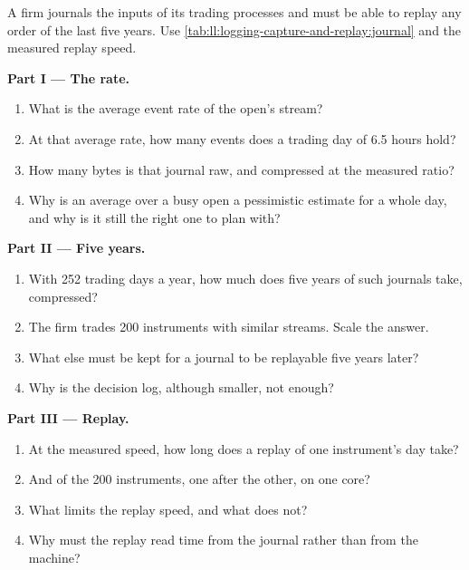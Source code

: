 \begin{problem}\label{pb:ll:logging-capture-and-replay:1}
A firm journals the inputs of its trading processes and must be able to replay any order of the last five years. Use
\cref{tab:ll:logging-capture-and-replay:journal} and the measured replay speed.

\medskip\noindent\textbf{Part I --- The rate.}
\begin{enumerate}
\item What is the average event rate of the open's stream?
\item At that average rate, how many events does a trading day of 6.5 hours hold?
\item How many bytes is that journal raw, and compressed at the measured ratio?
\item Why is an average over a busy open a pessimistic estimate for a whole day, and why is it still the right one to plan
with?
\end{enumerate}

\medskip\noindent\textbf{Part II --- Five years.}
\begin{enumerate}[resume]
\item With 252 trading days a year, how much does five years of such journals take, compressed?
\item The firm trades 200 instruments with similar streams. Scale the answer.
\item What else must be kept for a journal to be replayable five years later?
\item Why is the decision log, although smaller, not enough?
\end{enumerate}

\medskip\noindent\textbf{Part III --- Replay.}
\begin{enumerate}[resume]
\item At the measured speed, how long does a replay of one instrument's day take?
\item And of the 200 instruments, one after the other, on one core?
\item What limits the replay speed, and what does not?
\item Why must the replay read time from the journal rather than from the machine?
\end{enumerate}


\end{problem}

